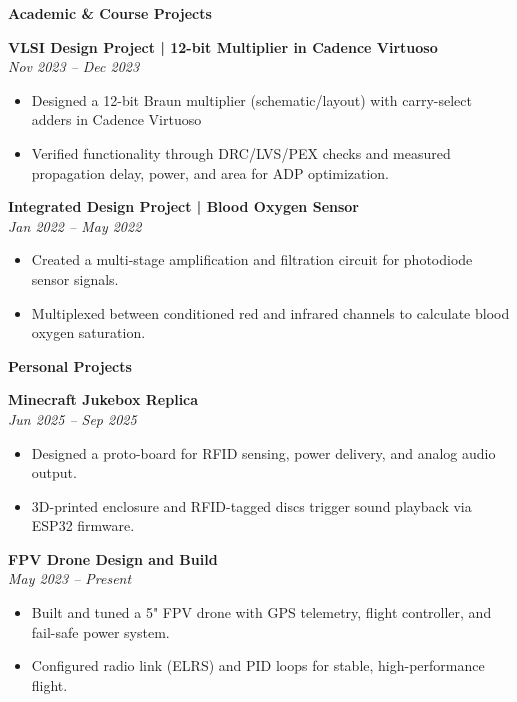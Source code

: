\documentclass[9pt, letterpaper]{extarticle}
\newenvironment{highlights}{
    \begin{itemize}[
        topsep=0 pt,
        parsep=0 pt, 
        partopsep=0pt,
        itemsep=0pt,
        leftmargin=0.25 cm + 10pt
    ]
}{
    \end{itemize}
} %
\begin{document}
\begin{minipage}[t]{0.48\textwidth}
\textbf{\large Academic \& Course Projects}

\vspace{4pt}

\textbf{VLSI Design Project | 12-bit Multiplier in Cadence Virtuoso} \\
\textit{Nov 2023 -- Dec 2023}
\begin{highlights}
    \item Designed a 12-bit Braun multiplier (schematic/layout) with carry-select adders in Cadence Virtuoso
    \item Verified functionality through DRC/LVS/PEX checks and measured propagation delay, power, and area for ADP optimization.  
\end{highlights}

\vspace{6pt}

\textbf{Integrated Design Project | Blood Oxygen Sensor} \\
\textit{Jan 2022 -- May 2022}
\begin{highlights}
    \item Created a multi-stage amplification and filtration circuit for photodiode sensor signals.
    \item Multiplexed between conditioned red and infrared channels to calculate blood oxygen saturation.
\end{highlights}
\end{minipage}
\hfill
\begin{minipage}[t]{0.48\textwidth}
\textbf{\large Personal Projects}

\vspace{4pt}

\textbf{Minecraft Jukebox Replica} \\
\textit{Jun 2025 -- Sep 2025}
\begin{highlights}
    \item Designed a proto-board for RFID sensing, power delivery, and analog audio output.
    \item 3D-printed enclosure and RFID-tagged discs trigger sound playback via ESP32 firmware.
\end{highlights}

\vspace{6pt}

\textbf{FPV Drone Design and Build} \\
\textit{May 2023 -- Present}
\begin{highlights}
    \item Built and tuned a 5" FPV drone with GPS telemetry, flight controller, and fail-safe power system.
    \item Configured radio link (ELRS) and PID loops for stable, high-performance flight.
\end{highlights}
\end{minipage}
\end{document}
